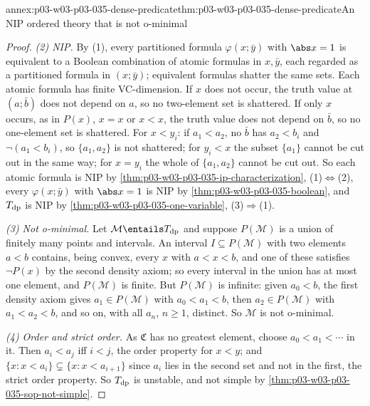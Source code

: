 \begin{annexitem}{annex:p03-w03-p03-035-dense-predicate}{thm:p03-w03-p03-035-dense-predicate}{An NIP ordered theory that is not o-minimal}
\begin{proof}
\emph{(2) NIP.}  By (1), every partitioned formula \(\varphi(x;\bar y)\)
with \(\abs x=1\) is equivalent to a Boolean combination of atomic formulas
in \(x,\bar y\), each regarded as a partitioned formula in \((x;\bar y)\);
equivalent formulas shatter the same sets.  Each atomic formula has finite
VC-dimension.  If \(x\) does not occur, the truth value at \((a;\bar b)\)
does not depend on \(a\), so no two-element set is shattered.  If only
\(x\) occurs, as in \(P(x)\), \(x=x\) or \(x<x\), the truth value does not
depend on \(\bar b\), so no one-element set is shattered.  For
\(x<y_i\): if \(a_1<a_2\), no \(\bar b\) has \(a_2<b_i\) and
\(\neg(a_1<b_i)\), so \(\{a_1,a_2\}\) is not shattered; for \(y_i<x\) the
subset \(\{a_1\}\) cannot be cut out in the same way; for \(x=y_i\) the
whole of \(\{a_1,a_2\}\) cannot be cut out.  So each atomic formula is NIP
by \cref{thm:p03-w03-p03-035-ip-characterization}, (1)\(\Leftrightarrow\)(2),
every \(\varphi(x;\bar y)\) with \(\abs x=1\) is NIP by
\cref{thm:p03-w03-p03-035-boolean}, and \(T_{\rm dp}\) is NIP by
\cref{thm:p03-w03-p03-035-one-variable}, (3)\(\Rightarrow\)(1).

\emph{(3) Not o-minimal.}  Let \(\mathcal M\entails T_{\rm dp}\) and suppose
\(P(\mathcal M)\) is a union of finitely many points and intervals.  An
interval \(I\subseteq P(\mathcal M)\) with two elements \(a<b\) contains,
being convex, every \(x\) with \(a<x<b\), and one of these satisfies
\(\neg P(x)\) by the second density axiom; so every interval in the union has
at most one element, and \(P(\mathcal M)\) is finite.  But
\(P(\mathcal M)\) is infinite: given \(a_0<b\), the first density axiom
gives \(a_1\in P(\mathcal M)\) with \(a_0<a_1<b\), then \(a_2\in
P(\mathcal M)\) with \(a_1<a_2<b\), and so on, with all \(a_n\), \(n\geq1\),
distinct.  So \(\mathcal M\) is not o-minimal.

\emph{(4) Order and strict order.}  As \(\mathfrak C\) has no greatest
element, choose \(a_0<a_1<\cdots\) in it.  Then \(a_i<a_j\) iff \(i<j\), the
order property for \(x<y\); and \(\{x:x<a_i\}\subsetneq\{x:x<a_{i+1}\}\)
since \(a_i\) lies in the second set and not in the first, the strict order
property.  So \(T_{\rm dp}\) is unstable, and not simple by
\cref{thm:p03-w03-p03-035-sop-not-simple}.
\end{proof}
\end{annexitem}

